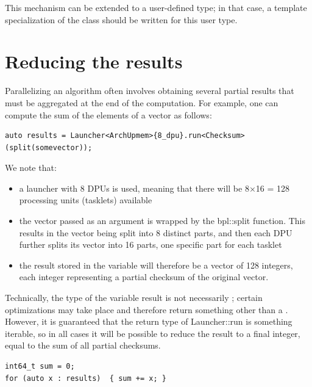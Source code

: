 This mechanism can be extended to a user-defined type; in that case, a template specialization of the  
class should be written for this user type. 


\section{Reducing the results}
Parallelizing an algorithm often involves obtaining several partial results that must be aggregated at the end of the computation. 
For example, one can compute the sum of the elements of a vector as follows:
\begin{verbatim}
auto results = Launcher<ArchUpmem>{8_dpu}.run<Checksum>(split(somevector));
\end{verbatim}
We note that:
\begin{itemize}
\item a launcher with 8 DPUs is used, meaning that there will be 8×16 = 128 processing units (tasklets) available
\item the vector passed as an argument is wrapped by the bpl::split function. This results in the vector being split 
into 8 distinct parts, and then each DPU further splits its vector into 16 parts, one specific part for each tasklet
\item the result stored in the  variable will therefore be a vector of 128 integers, each integer representing
 a partial checksum of the original vector.
\end{itemize}

Technically, the type of the variable result is not necessarily ;
certain optimizations may take place and therefore return something other than a  . 
However, it is guaranteed that the return type of Launcher::run is something iterable, so in all cases it will be possible 
to reduce the result to a final integer, equal to the sum of all partial checksums.
\begin{verbatim}
int64_t sum = 0;
for (auto x : results)  { sum += x; }
\end{verbatim}

